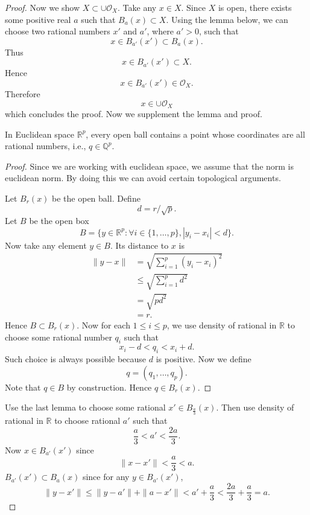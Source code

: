 \begin{enumerate}
\begin{proof}
	Now we show $ X \subset \cup \mathcal{O}_X $. Take any $x \in X$. Since $X$ is open, there exists some positive real $a$ such that $B_a(x) \subset X$. Using the lemma below, we can choose two rational numbers $x'$ and $a'$, where $a'>0$, such that \[
		x \in B_{a'}(x') \subset B_a(x)
	.\] 
	Thus \[
		x \in B_{a'}(x') \subset X
	.\] 
	Hence \[
		x \in B_{a'}(x') \in \mathcal{O}_X
	.\] 
	Therefore 
	\[
		x \in \cup \mathcal{O}_X
	\] 
	which concludes the proof. Now we supplement the lemma and proof.	

	\begin{lemma}
		In Euclidean space $\mathbb{R}^p$, every open ball contains a point whose coordinates are all rational numbers, i.e., $q \in \mathbb{Q}^p$.
	\end{lemma}
	\begin{proof}
		Since we are working with euclidean space, we assume that the norm is euclidean norm. By doing this we can avoid certain topological arguments.

		Let $B_r(x)$ be the open ball. Define \[
			d = r / \sqrt{p} 
		.\] 
		Let $B$ be the open box \[
			B = \{y \in \mathbb{R}^p: \forall i \in \{1,\ldots,p\}, \left| y_i - x_i \right| < d\} 
		.\] 
		Now take any element $y \in B$. Its distance to $x$ is
		 \begin{align*}
			\|y-x\| &= \sqrt{ \sum_{i=1}^{p} \left( y_i - x_i \right) ^2} \\
				&\le \sqrt{\sum_{i=1}^{p} d^2} \\
				&= \sqrt{pd^2}  \\
				&= r
		.\end{align*}
		Hence $B \subset B_r(x)$. Now for each $1\le i\le p$, we use density of rational in $\mathbb{R}$ to choose some rational number $q_i$ such that
		\[
			x_i - d < q_i < x_i + d
		.\] 
		Such choice is always possible because $d$ is positive. Now we define \[
			q = (q_1, \ldots, q_p)
		.\] 
		Note that $q \in B$ by construction. Hence $q \in B_r(x)$.

	\end{proof}
	Use the last lemma to choose some rational $x' \in B_{\frac{a}{3}}(x)$. Then use density of rational in $\mathbb{R}$ to choose rational $a'$ such that  \[
		\frac{a}{3} < a' < \frac{2a}{3}
	.\] 
	Now $x \in B_{a'}(x')$ since 
	\[
		\|x-x'\| < \frac{a}{3} < a
	.\] 
	$B_{a'}(x') \subset B_a(x)$ since for any $y \in B_{a'}(x')$, \[
		\|y-x'\|\le \|y-a'\|+\|a-x'\|< a' + \frac{a}{3} < \frac{2a}{3}+\frac{a}{3} = a
	.\] 
	

\end{proof}
\end{enumerate}
